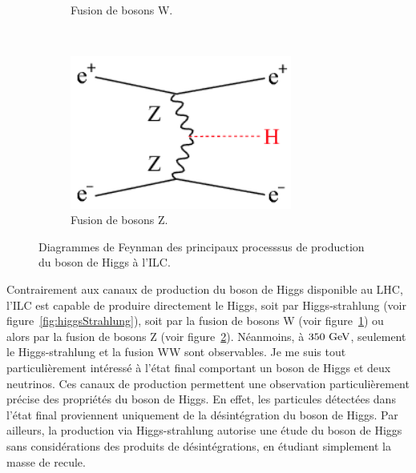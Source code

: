 \begin{figure}
\begin{subfigure}[t]{0.3\textwidth}
            \caption{Fusion de bosons W.}
            \label{fig:WW-fusion}
        \end{subfigure}
        ~%
        \begin{subfigure}[t]{0.3\textwidth}
            \includegraphics[width = 0.8\textwidth]{Pictures/Higgs/HiggsProd_eeH.png}
            \caption{Fusion de bosons Z.}
            \label{fig:ZZ-fusion}
        \end{subfigure}
        \caption{Diagrammes de Feynman des principaux processsus de production du boson de Higgs à l'ILC\cite{Asner2013}\cite{tian}.}
        \label{fig:higgsProduction}
    \end{figure}    

  Contrairement aux canaux de production du boson de Higgs disponible au LHC, l'ILC est capable de produire directement le Higgs, soit par Higgs-strahlung (voir figure~\ref{fig:higgsStrahlung}), soit par la fusion de bosons W (voir figure~\ref{fig:WW-fusion}) ou alors par la fusion de bosons Z (voir figure~\ref{fig:ZZ-fusion}).
  Néanmoins, à $350~\rm{GeV}$, seulement le Higgs-strahlung et la fusion WW sont observables.
  Je me suis tout particulièrement intéressé à l'état final comportant un boson de Higgs et deux neutrinos.
  Ces canaux de production permettent une observation particulièrement précise des propriétés du boson de Higgs. 
  En effet, les particules détectées dans l'état final proviennent uniquement de la désintégration du boson de Higgs. 
  Par ailleurs, la production via Higgs-strahlung autorise une étude du boson de Higgs sans considérations des produits de désintégrations, en étudiant simplement la masse de recule.
  
